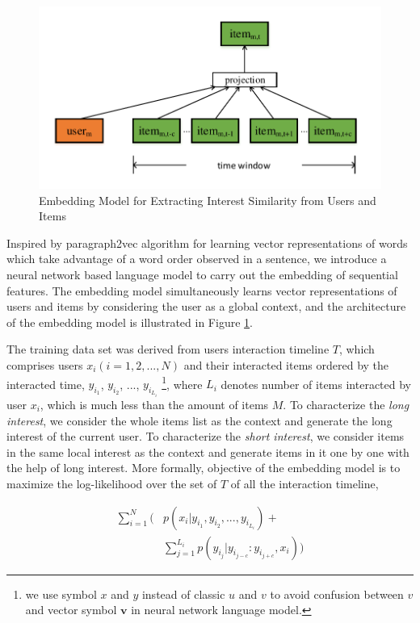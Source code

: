 \documentclass{llncs}
\begin{document}
\begin{figure}[htbp]
	\centering
	\includegraphics[scale=0.55]{images/doc2vec.pdf}
	\caption{Embedding Model for Extracting Interest Similarity from Users and Items}
	\label{fig:doc2vec}
\end{figure}

Inspired by paragraph2vec algorithm \cite{le2014distributed} for learning
vector representations of words which take advantage of a word order observed in a sentence,
we introduce a neural network based language model to carry out the embedding of sequential features.
The embedding model simultaneously learns vector representations of users and items
by considering the user as a global context,
and the architecture of the embedding model is illustrated in Figure \ref{fig:doc2vec}.

The training data set was derived from users interaction timeline $T$,
which comprises users $x_i (i=1,2,...,N)$ and their interacted items ordered by the interacted time,
$y_{i_1}$, $y_{i_2}$, ..., $y_{i_{L_i}}$
\footnote{we use symbol $x$ and $y$ instead of classic $u$ and $v$ to avoid confusion between $v$
	and vector symbol $\mathbf{v}$ in neural network language model.},
where $L_i$ denotes number of items interacted by user $x_i$,
which is much less than the amount of items $M$.
To characterize the \emph{long interest}, we consider the whole items list as the context and generate
the long interest of the current user.
To characterize the \emph{short interest}, we consider items in the same local interest as the context
and generate items in it one by one with the help of long interest.
More formally, objective of the embedding model is to
maximize the log-likelihood over the set of $T$ of all the interaction timeline,

\begin{equation}
\begin{aligned}
\sum_{i=1}^{N} \bigg( &p(x_i | y_{i_1}, y_{i_2}, ..., y_{i_{L_i}}) + \\
&\sum_{j=1}^{L_i} p(y_{i_j} | y_{i_{j-c}} : y_{i_{j+c}}, x_i) \bigg)
\end{aligned}
\end{equation}
\end{document}

